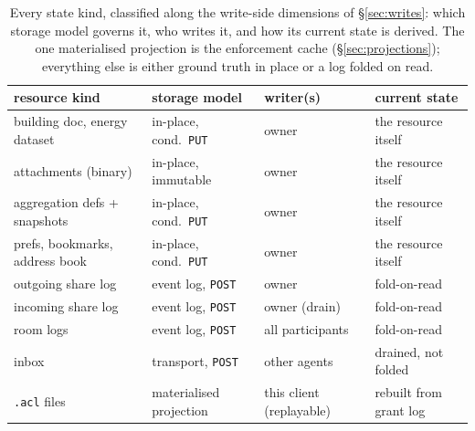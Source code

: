 \documentclass[11pt,a4paper]{article}
\theoremstyle{remark}
\newcommand{\code}[1]{\texttt{#1}}
\begin{document}
\begin{table}[t]
\centering
\small
\setlength{\tabcolsep}{3.5pt}
\begin{tabular}{@{}llll@{}}
resource kind & storage model & writer(s) & current state \\
\hline
building doc, energy dataset & in-place, cond.\ \code{PUT} & owner & the resource itself \\
attachments (binary) & in-place, immutable & owner & the resource itself \\
aggregation defs + snapshots & in-place, cond.\ \code{PUT} & owner & the resource itself \\
prefs, bookmarks, address book & in-place, cond.\ \code{PUT} & owner & the resource itself \\
outgoing share log & event log, \code{POST} & owner & fold-on-read \\
incoming share log & event log, \code{POST} & owner (drain) & fold-on-read \\
room logs & event log, \code{POST} & all participants & fold-on-read \\
inbox & transport, \code{POST} & other agents & drained, not folded \\
\code{.acl} files & materialised projection & this client (replayable) & rebuilt from grant log \\
\end{tabular}
\caption{Every state kind, classified along the write-side dimensions of
\S\ref{sec:writes}: which storage model governs it, who writes it, and how its
current state is derived. The one materialised projection is the enforcement
cache (\S\ref{sec:projections}); everything else is either ground truth
in place or a log folded on read.}
\label{tab:statekinds}
\end{table}
\end{document}
